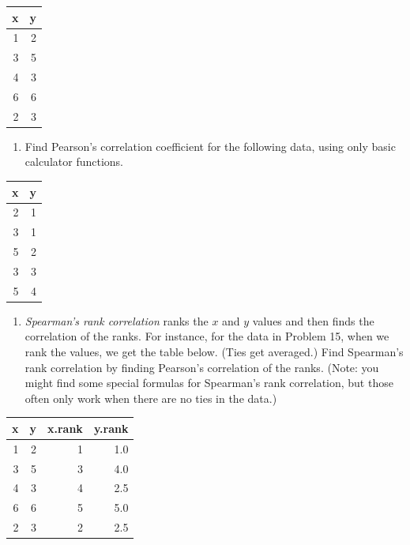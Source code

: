 \documentclass[
]{book}
\providecommand{\tightlist}{%
  \setlength{\itemsep}{0pt}\setlength{\parskip}{0pt}}
\theoremstyle{definition}
\theoremstyle{definition}
\theoremstyle{definition}
\theoremstyle{definition}
\theoremstyle{remark}
\begin{document}
\begin{longtable}{rr}
\toprule
x & y\\
\midrule
1 & 2\\
3 & 5\\
4 & 3\\
6 & 6\\
2 & 3\\
\bottomrule
\end{longtable}

\begin{enumerate}
\def\labelenumi{\arabic{enumi}.}
\setcounter{enumi}{15}
\tightlist
\item
  Find Pearson's correlation coefficient for the following data, using only basic calculator functions.
\end{enumerate}

\begin{longtable}{rr}
\toprule
x & y\\
\midrule
2 & 1\\
3 & 1\\
5 & 2\\
3 & 3\\
5 & 4\\
\bottomrule
\end{longtable}

\begin{enumerate}
\def\labelenumi{\arabic{enumi}.}
\setcounter{enumi}{16}
\tightlist
\item
  \emph{Spearman's rank correlation} ranks the \(x\) and \(y\) values and then finds the correlation of the ranks. For instance, for the data in Problem 15, when we rank the values, we get the table below. (Ties get averaged.) Find Spearman's rank correlation by finding Pearson's correlation of the ranks. (Note: you might find some special formulas for Spearman's rank correlation, but those often only work when there are no ties in the data.)
\end{enumerate}

\begin{longtable}{rrrr}
\toprule
x & y & x.rank & y.rank\\
\midrule
1 & 2 & 1 & 1.0\\
3 & 5 & 3 & 4.0\\
4 & 3 & 4 & 2.5\\
6 & 6 & 5 & 5.0\\
2 & 3 & 2 & 2.5\\
\bottomrule
\end{longtable}
\end{document}
